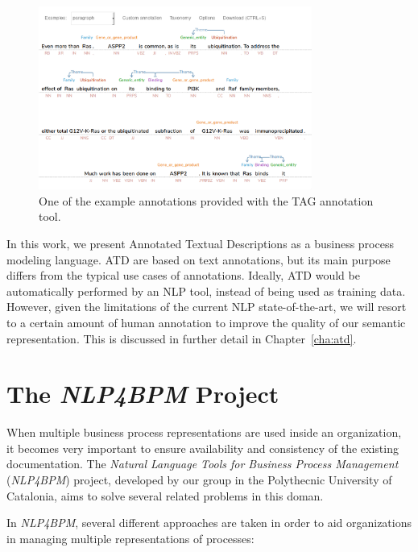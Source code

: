 \begin{figure}[htb]
  \centering
  \includegraphics[width=0.8\textwidth]{figures/tag}
  \caption{One of the example annotations provided with the TAG
    annotation tool.}
  \label{fig:tag}
\end{figure}

In this work, we present Annotated Textual Descriptions as a business process
modeling language. ATD are based on text annotations, but its main purpose
differs from the typical use cases of annotations. Ideally, ATD would be
automatically performed by an NLP tool, instead of being used as training data.
However, given the limitations of the current NLP state-of-the-art, we will
resort to a certain amount of human annotation to improve the quality of our
semantic representation. This is discussed in further detail in Chapter~\ref{cha:atd}.

\section{The \emph{NLP4BPM} Project}
\label{sec:background_nlp4bpm}

When multiple business process representations are used inside an organization,
it becomes very important to ensure availability and consistency of the existing
documentation. The \emph{Natural Language Tools for Business Process Management}
(\emph{NLP4BPM}) project, developed by our group in the Polythecnic University
of Catalonia, aims to solve several related problems in this doman.

In \emph{NLP4BPM}, several different approaches are taken in order to aid
organizations in managing multiple representations of processes:

